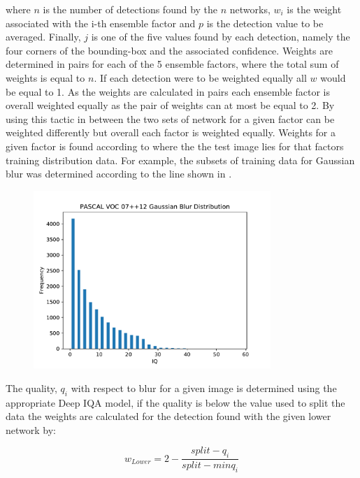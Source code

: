 where $n$ is the number of detections found by the $n$ networks, $w_i$ is the weight associated with the i-th ensemble factor and $p$ is the detection value to be averaged. Finally, $j$ is one of the five values found by each detection, namely the four corners of the bounding-box and the associated confidence.
Weights are determined in pairs for each of the 5 ensemble factors, where the total sum of weights is equal to $n$. If each detection were to be weighted equally all $w$ would be equal to 1. As the weights are calculated in pairs each ensemble factor is overall weighted equally as the pair of weights can at most be equal to 2. By using this tactic in between the two sets of network for a given factor can be weighted differently but overall each factor is weighted equally.
Weights for a given factor is found according to where the the test image lies for that factors training distribution data. For example, the subsets of training data for Gaussian blur was determined according to the line shown in . 


\begin{figure}[H]
  \centering
    \includegraphics[width=0.8\textwidth]{Figs/Implementation/GaussianBlurdist.pdf}
      \caption{}
    \label{fig:blur_dist}
\end{figure}

The quality, $q_i$ with respect to blur for a given image is determined using the appropriate Deep IQA model, if the quality is below the value used to split the data the weights are calculated for the detection found with the given lower network by:

\begin{equation}
	w_{Lower} = 2 - \frac{split - q_i}{split - minq_i}
\end{equation}

